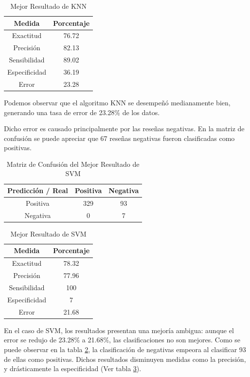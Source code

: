\documentclass[hidelinks]{sig-alternate-05-2015}
\begin{document}
\begin{table}[H]
\centering
\caption{Mejor Resultado de KNN}
\begin{tabular}{|c|c|} 			\hline
Medida  		& Porcentaje 	\\ \hline
Exactitud 		& 76.72			\\ \hline
Precisión 		& 82.13			\\ \hline
Sensibilidad 	& 89.02			\\ \hline
Especificidad	& 36.19			\\ \hline
Error			& 23.28 		\\
\hline\end{tabular}
\label{table:KNN}
\end{table}

Podemos observar que el algoritmo KNN se desempeñó medianamente bien, generando una tasa de error de 23.28$\%$ de los datos.

Dicho error es causado principalmente por las reseñas negativas. En la matriz de confusión se puede apreciar que 67 reseñas negativas fueron clasificadas como positivas. 

\begin{table}[H]
\centering
\caption{Matriz de Confusión del Mejor Resultado de SVM}
\begin{tabular}{|c|c|c|} 					\hline
Predicción / Real	& Positiva 	& Negativa 	\\ \hline
Positiva 			& 329 		& 93 		\\ \hline
Negativa 			& 0 		& 7			\\
\hline\end{tabular}
\label{table:MC-SVM}
\end{table}

\begin{table}[H]
\centering
\caption{Mejor Resultado de SVM}
\begin{tabular}{|c|c|} 			\hline
Medida  		& Porcentaje 	\\ \hline
Exactitud 		& 78.32			\\ \hline
Precisión 		& 77.96			\\ \hline
Sensibilidad 	& 100			\\ \hline
Especificidad	& 7				\\ \hline
Error			& 21.68 		\\
\hline\end{tabular}
\label{table:SVM}
\end{table}

En el caso de SVM, los resultados presentan una mejoría ambigua: aunque el error se redujo de 23.28$\%$ a 21.68$\%$, las clasificaciones no son mejores. Como se puede observar en la tabla \ref{table:MC-SVM}, la clasificación de negativas empeora al clasificar 93 de ellas como positivas. Dichos resultados disminuyen medidas como la precisión, y drásticamente la especificidad (Ver tabla \ref{table:SVM}).
\end{document}
